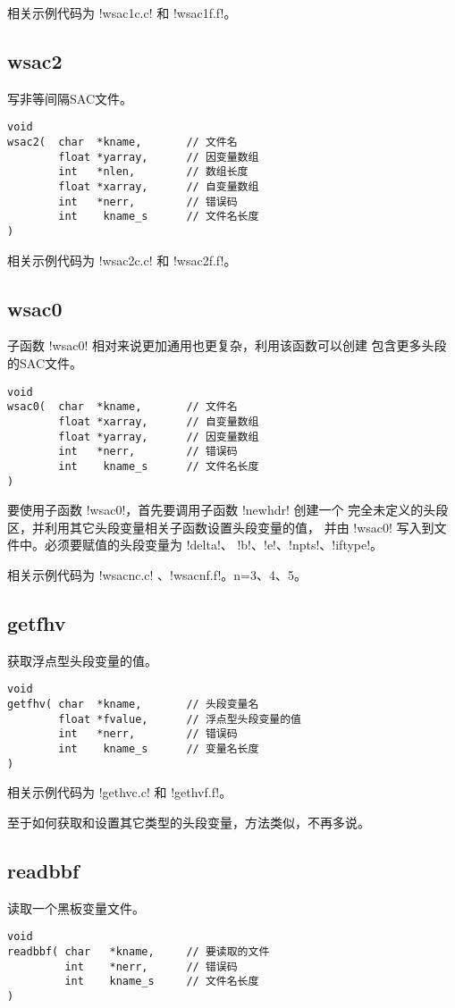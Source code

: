 相关示例代码为 !wsac1c.c! 和 !wsac1f.f!。

\subsection{wsac2}
写非等间隔SAC文件。

\begin{verbatim}
void
wsac2(  char  *kname,       // 文件名
        float *yarray,      // 因变量数组
        int   *nlen,        // 数组长度
        float *xarray,      // 自变量数组
        int   *nerr,        // 错误码
        int    kname_s      // 文件名长度
)
\end{verbatim}

相关示例代码为 !wsac2c.c! 和 !wsac2f.f!。

\subsection{wsac0}
子函数 !wsac0! 相对来说更加通用也更复杂，利用该函数可以创建
包含更多头段的SAC文件。

\begin{verbatim}
void
wsac0(  char  *kname,       // 文件名
        float *xarray,      // 自变量数组
        float *yarray,      // 因变量数组
        int   *nerr,        // 错误码
        int    kname_s      // 文件名长度
)
\end{verbatim}

要使用子函数 !wsac0!，首先要调用子函数 !newhdr! 创建一个
完全未定义的头段区，并利用其它头段变量相关子函数设置头段变量的值，
并由 !wsac0! 写入到文件中。必须要赋值的头段变量为 !delta!、
!b!、!e!、!npts!、!iftype!。

相关示例代码为 !wsacnc.c! 、!wsacnf.f!。n=3、4、5。

\subsection{getfhv}
获取浮点型头段变量的值。
\begin{verbatim}
void
getfhv( char  *kname,       // 头段变量名
        float *fvalue,      // 浮点型头段变量的值
        int   *nerr,        // 错误码
        int    kname_s      // 变量名长度
)
\end{verbatim}

相关示例代码为 !gethvc.c! 和 !gethvf.f!。

至于如何获取和设置其它类型的头段变量，方法类似，不再多说。

\subsection{readbbf}
读取一个黑板变量文件。
\begin{verbatim}
void
readbbf( char   *kname,     // 要读取的文件
         int    *nerr,      // 错误码
         int    kname_s     // 文件名长度
)
\end{verbatim}


